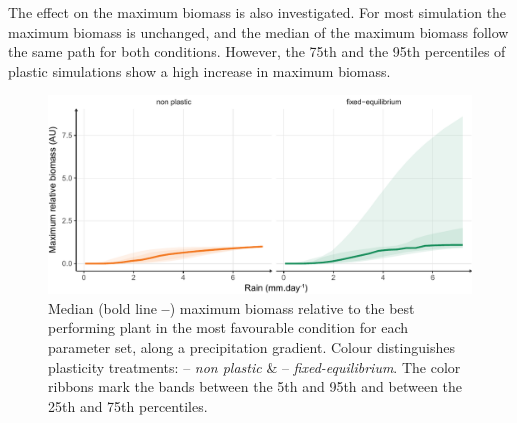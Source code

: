 \begin{figure}\label{fig:total_BM}
    \classiccaptionstyle
{}
\end{figure}

The effect on the maximum biomass is also investigated. For most simulation the maximum biomass is unchanged, and the median of the maximum biomass follow the same path for both conditions. However, the 75th and the 95th percentiles of plastic simulations show a high increase in maximum biomass.

\begin{figure}\label{fig:maximum_BM}
\includegraphics[width = \textwidth]{./2_PP/Figures/Rain/gradient_rel_BM_pl_trend.pdf}
\caption[Maximum biomass relative along a precipitation gradient]{Median (bold line \textbf{--}) maximum biomass relative to the best performing plant in the most favourable condition for each parameter set, along a precipitation gradient.  Colour distinguishes plasticity treatments: \textcolor{myOrange}{-- \textit{non plastic}} \&  \textcolor{myGreen}{-- \textit{fixed-equilibrium}}. The color ribbons mark the bands between the 5th and 95th and between the 25th and 75th percentiles.}
\end{figure}

